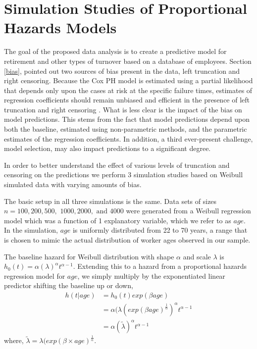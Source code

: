 \documentclass[12pt,letterpaper]{article}
\begin{document}
 \section{Simulation Studies of Proportional Hazards Models}

The goal of the proposed data analysis is to create a predictive model for retirement and other types of turnover based on a database of employees.  Section \ref{bias}, pointed out two sources of bias present in the data, left truncation and right censoring.  Because the Cox PH model is estimated using a partial likelihood that depends only upon the cases at risk at the specific failure times, estimates of regression coefficients should remain unbiased and efficient in the presence of left truncation and right censoring \citep{Harrell2002}.  What is less clear is the impact of the bias on model predictions. This stems from the fact that model predictions depend upon both the baseline, estimated using non-parametric methods, and the parametric estimates of the regression coefficients.  In addition, a third ever-present challenge, model selection, may also impact predictions to a significant degree.

In order to better understand the effect of various levels of truncation and censoring on the predictions we perform 3 simulation studies based on Weibull simulated data with varying amounts of bias.

The basic setup in all three simulations is the same. Data sets of sizes $n =100, 200, 500,$ $1000, 2000,$ $\text{and } 4000$ were generated from a Weibull regression model which was a function of 1 explanatory variable, which we refer to as $age$.  In the simulation, $age$ is uniformly distributed from 22 to 70 years, a range that is chosen to mimic the actual distribution of worker ages observed in our sample.

The baseline hazard for Weibull distribution with shape $\alpha$ and scale $\lambda$ is $h_0(t)=\alpha(\lambda)^\alpha t^{\alpha-1}$.  Extending this to a hazard from a proportional hazards regression model for $age$, we simply multiply by the exponentiated linear predictor shifting the baseline up or down,
\begin{equation} \label{eq:weibull}
\begin{split}%
h(t|age) & =h_0(t)exp(\beta age) \\
&=\alpha (\lambda (exp(\beta age)^{\frac{1}{\alpha}})^\alpha t^{\alpha-1} \\
&=\alpha(\tilde{\lambda} )^\alpha t^{\alpha-1}
\end{split}
\end{equation}
where, $\tilde{\lambda}=\lambda (exp(\beta \times age)^{\frac{1}{\alpha}}$.
\end{document}
